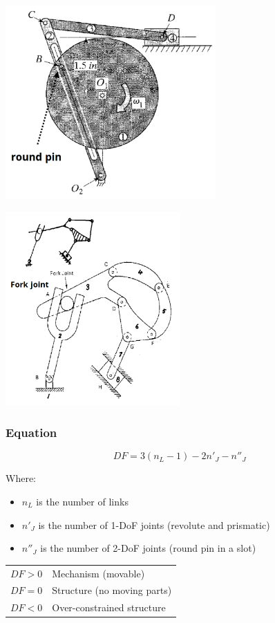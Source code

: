 \documentclass[11pt]{article}
\begin{document}
\begin{center}
\includegraphics[height=20em]{./images/pin-in-slot-joint.png}
\end{center}

\begin{center}
\includegraphics[height=20em]{./images/fork-joint.png}
\end{center}

 \newpage
\subsubsection{Equation}
\label{sec:orgef1dfeb}
\[DF = 3(n_L - 1) - 2n'_J - n''_J\]

Where:
\begin{itemize}
\item \(n_L\) is the number of links
\item \(n'_J\) is the number of 1-DoF joints (revolute and prismatic)
\item \(n''_J\) is the number of 2-DoF joints (round pin in a slot)
\end{itemize}

\begin{center}
\begin{tabular}{l|l}
\(DF > 0\) & Mechanism (movable)\\
\(DF = 0\) & Structure (no moving parts)\\
\(DF < 0\) & Over-constrained structure\\
\end{tabular}
\end{center}
\end{document}

